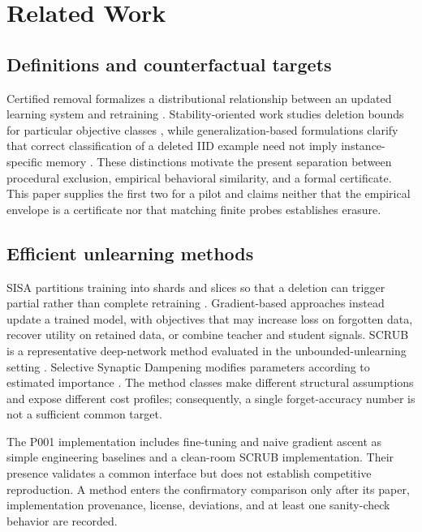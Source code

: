 \section{Related Work}
\subsection{Definitions and counterfactual targets}
Certified removal formalizes a distributional relationship between an updated learning
system and retraining \cite{guo2020certified}.  Stability-oriented work studies deletion
bounds for particular objective classes \cite{neel2021descent}, while generalization-based
formulations clarify that correct classification of a deleted IID example need not imply
instance-specific memory \cite{sekhari2021remember}.  These distinctions motivate the
present separation between procedural exclusion, empirical behavioral similarity, and a
formal certificate.  This paper supplies the first two for a pilot and claims neither that
the empirical envelope is a certificate nor that matching finite probes establishes erasure.

\subsection{Efficient unlearning methods}
SISA partitions training into shards and slices so that a deletion can trigger partial
rather than complete retraining \cite{bourtoule2021machine}.  Gradient-based approaches
instead update a trained model, with objectives that may increase loss on forgotten data,
recover utility on retained data, or combine teacher and student signals.  SCRUB is a
representative deep-network method evaluated in the unbounded-unlearning setting
\cite{kurmanji2023unbounded}.  Selective Synaptic Dampening modifies parameters according
to estimated importance \cite{foster2024ssd}.  The method classes make different structural
assumptions and expose different cost profiles; consequently, a single forget-accuracy
number is not a sufficient common target.

The P001 implementation includes fine-tuning and naive gradient ascent as simple
engineering baselines and a clean-room SCRUB implementation.  Their presence validates a
common interface but does not establish competitive reproduction.  A method enters the
confirmatory comparison only after its paper, implementation provenance, license,
deviations, and at least one sanity-check behavior are recorded.

